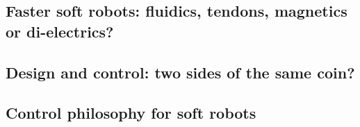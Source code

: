 \subsection*{Faster soft robots: fluidics, tendons, magnetics or di-electrics?}

\subsection*{Design and control: two sides of the same coin?}

\subsection*{Control philosophy for soft robots}




